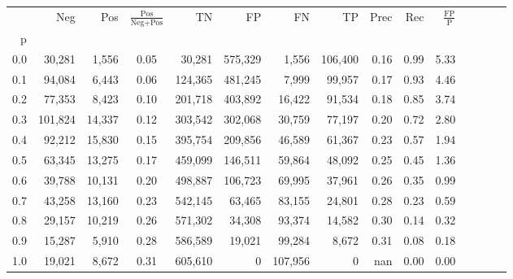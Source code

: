 \begin{tabular}{rrrcrrrrrrrrrrr}
\toprule
{} &      Neg &     Pos & $\frac{\text{Pos}}{\text{Neg}+\text{Pos}}$ &       TN &       FP &       FN &       TP &  Prec &   Rec & $\frac{\text{FP}}{\text{P}}$ \\
p   &          &         &                                            &          &          &          &          &       &       &                              \\
\midrule
0.0 &   30,281 &   1,556 &                                       0.05 &   30,281 &  575,329 &    1,556 &  106,400 &  0.16 &  0.99 &                         5.33 \\
0.1 &   94,084 &   6,443 &                                       0.06 &  124,365 &  481,245 &    7,999 &   99,957 &  0.17 &  0.93 &                         4.46 \\
0.2 &   77,353 &   8,423 &                                       0.10 &  201,718 &  403,892 &   16,422 &   91,534 &  0.18 &  0.85 &                         3.74 \\
0.3 &  101,824 &  14,337 &                                       0.12 &  303,542 &  302,068 &   30,759 &   77,197 &  0.20 &  0.72 &                         2.80 \\
0.4 &   92,212 &  15,830 &                                       0.15 &  395,754 &  209,856 &   46,589 &   61,367 &  0.23 &  0.57 &                         1.94 \\
0.5 &   63,345 &  13,275 &                                       0.17 &  459,099 &  146,511 &   59,864 &   48,092 &  0.25 &  0.45 &                         1.36 \\
0.6 &   39,788 &  10,131 &                                       0.20 &  498,887 &  106,723 &   69,995 &   37,961 &  0.26 &  0.35 &                         0.99 \\
0.7 &   43,258 &  13,160 &                                       0.23 &  542,145 &   63,465 &   83,155 &   24,801 &  0.28 &  0.23 &                         0.59 \\
0.8 &   29,157 &  10,219 &                                       0.26 &  571,302 &   34,308 &   93,374 &   14,582 &  0.30 &  0.14 &                         0.32 \\
0.9 &   15,287 &   5,910 &                                       0.28 &  586,589 &   19,021 &   99,284 &    8,672 &  0.31 &  0.08 &                         0.18 \\
1.0 &   19,021 &   8,672 &                                       0.31 &  605,610 &        0 &  107,956 &        0 &   nan &  0.00 &                         0.00 \\
\bottomrule
\end{tabular}
